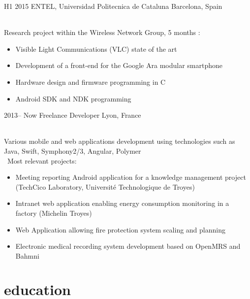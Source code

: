 \documentclass[]{cv-style}          %
\begin{document}
\begin{entrylist}
 \entry
  {H1 2015  }
  {ENTEL, Universidad Politecnica de Cataluna}
  {Barcelona, Spain}
  {\\
  Research project within the Wireless Network Group, 5 months :
  \begin{itemize}
    \item Visible Light Communications (VLC) state of the art
    \item Development of a front-end for the Google Ara modular smartphone
    \item Hardware design and firmware programming in C
    \item Android SDK and NDK programming
  \end{itemize}}
\entry
  {2013-- Now}
  {Freelance Developer}
  {Lyon, France}
  {\\
  Various mobile and web applications development using technologies such as Java, Swift, Symphony2/3, Angular, Polymer\\\
  Most relevant projects:
  \begin{itemize}
    \item Meeting reporting Android application for a knowledge management project (TechCico Laboratory, Université Technologique de Troyes)
    \item Intranet web application enabling energy consumption monitoring in a factory (Michelin Troyes)
    \item Web Application allowing fire protection system scaling and planning
    \item Electronic medical recording system development based on OpenMRS and Bahmni
  \end{itemize}}
\end{entrylist}

\section{education}
\end{document}
